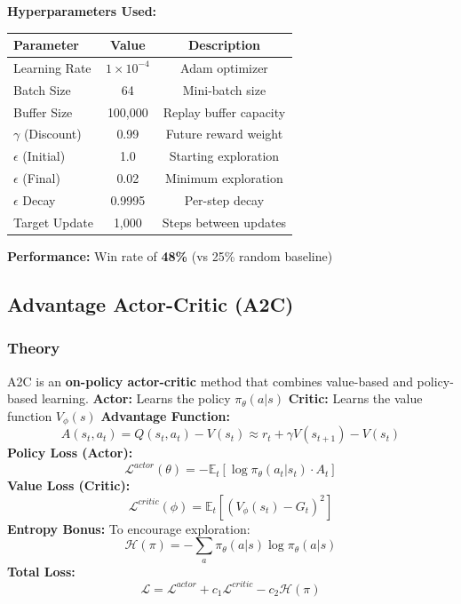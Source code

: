 \documentclass[12pt,a4paper]{article}
\begin{document}
\textbf{Hyperparameters Used:}
\begin{table}[H]
\centering
\begin{tabular}{lcc}
\toprule
\textbf{Parameter} & \textbf{Value} & \textbf{Description} \\
\midrule
Learning Rate & $1 \times 10^{-4}$ & Adam optimizer \\
Batch Size & 64 & Mini-batch size \\
Buffer Size & 100,000 & Replay buffer capacity \\
$\gamma$ (Discount) & 0.99 & Future reward weight \\
$\epsilon$ (Initial) & 1.0 & Starting exploration \\
$\epsilon$ (Final) & 0.02 & Minimum exploration \\
$\epsilon$ Decay & 0.9995 & Per-step decay \\
Target Update & 1,000 & Steps between updates \\
\bottomrule
\end{tabular}
\label{tab:dqn_hyper}
\end{table}
\textbf{Performance:} Win rate of \textbf{48\%} (vs 25\% random baseline)

\subsection{Advantage Actor-Critic (A2C)}
\label{subsec:a2c}
\subsubsection{Theory}
A2C is an \textbf{on-policy actor-critic} method that combines value-based and policy-based learning.
\textbf{Actor:} Learns the policy $\pi_\theta(a|s)$
\textbf{Critic:} Learns the value function $V_\phi(s)$
\textbf{Advantage Function:}
\begin{equation}
    A(s_t, a_t) = Q(s_t, a_t) - V(s_t) \approx r_t + \gamma V(s_{t+1}) - V(s_t)
\end{equation}
\textbf{Policy Loss (Actor):}
\begin{equation}
    \mathcal{L}^{actor}(\theta) = -\mathbb{E}_t \left[ \log \pi_\theta(a_t|s_t) \cdot A_t \right]
\end{equation}
\textbf{Value Loss (Critic):}
\begin{equation}
    \mathcal{L}^{critic}(\phi) = \mathbb{E}_t \left[ \left( V_\phi(s_t) - G_t \right)^2 \right]
\end{equation}
\textbf{Entropy Bonus:} To encourage exploration:
\begin{equation}
    \mathcal{H}(\pi) = -\sum_a \pi_\theta(a|s) \log \pi_\theta(a|s)
\end{equation}
\textbf{Total Loss:}
\begin{equation}
    \mathcal{L} = \mathcal{L}^{actor} + c_1 \mathcal{L}^{critic} - c_2 \mathcal{H}(\pi)
\end{equation}
\end{document}
